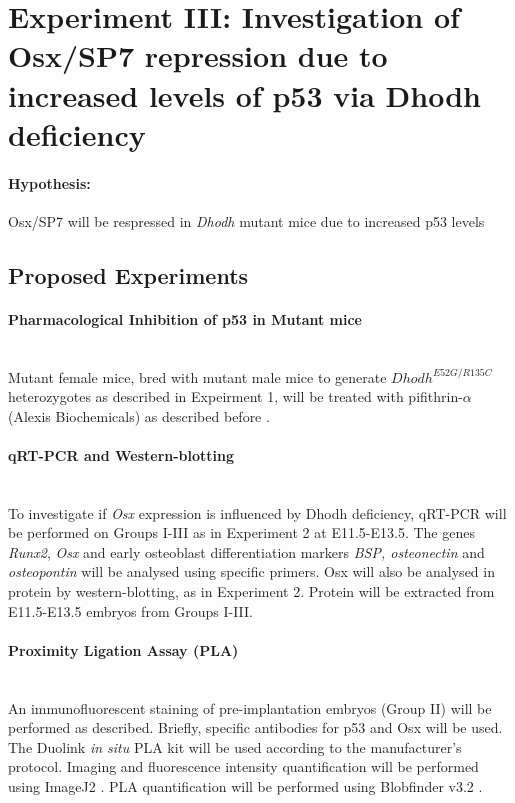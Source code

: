 \documentclass[12pt]{article}
\begin{document}
\pagebreak

\section{Experiment III: Investigation of Osx/SP7 repression due to increased levels of p53 via Dhodh deficiency}
\paragraph{Hypothesis:} Osx/SP7 will be respressed in \textit{Dhodh} mutant mice due to increased p53 levels

\subsection{Proposed Experiments}
\paragraph{Pharmacological Inhibition of p53 in Mutant mice}
~\\Mutant female mice, bred with mutant male mice to generate  $Dhodh^{E52G/R135C}$ heterozygotes as described in Expeirment 1, will be treated with pifithrin-$\alpha$ (Alexis Biochemicals) as described before \citep{jones2008prevention}.

\paragraph{qRT-PCR and Western-blotting}
~\\ To investigate if \textit{Osx} expression is influenced by Dhodh deficiency,  qRT-PCR will be performed on Groups I-III as in Experiment 2 at E11.5-E13.5. The genes  \textit{Runx2}, \textit{Osx} and early osteoblast differentiation markers \textit{BSP, osteonectin} and \textit{osteopontin} will be analysed using specific primers. Osx will also be analysed in protein by western-blotting, as in Experiment 2.  Protein will be extracted from E11.5-E13.5 embryos from Groups I-III. 

\paragraph{Proximity Ligation Assay (PLA)}
~\\An immunofluorescent staining of pre-implantation embryos (Group II) will be performed as described. Briefly, specific antibodies for p53 and Osx will be used. The Duolink \textit{in situ} PLA kit will be used according to the manufacturer’s protocol. Imaging  and fluorescence intensity quantification will be performed using ImageJ2 \citep{rueden2017imagej2}. PLA quantification will be performed using Blobfinder v3.2  \citep{allalou2009blobfinder}.
\end{document}
